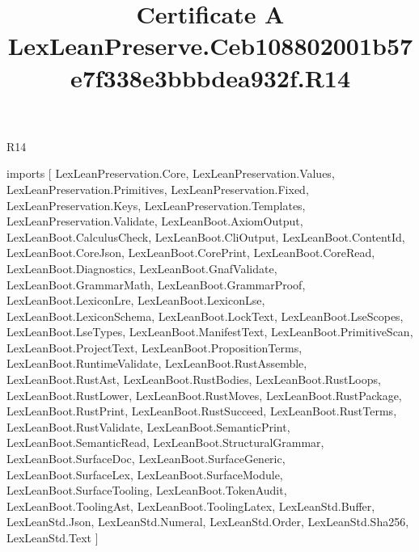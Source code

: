 \begin{lexlean}{R14}
\title{Certificate A LexLeanPreserve.Ceb108802001b57e7f338e3bbbdea932f.R14}
\begin{coremodule}
imports [
  LexLeanPreservation.Core,
  LexLeanPreservation.Values,
  LexLeanPreservation.Primitives,
  LexLeanPreservation.Fixed,
  LexLeanPreservation.Keys,
  LexLeanPreservation.Templates,
  LexLeanPreservation.Validate,
  LexLeanBoot.AxiomOutput,
  LexLeanBoot.CalculusCheck,
  LexLeanBoot.CliOutput,
  LexLeanBoot.ContentId,
  LexLeanBoot.CoreJson,
  LexLeanBoot.CorePrint,
  LexLeanBoot.CoreRead,
  LexLeanBoot.Diagnostics,
  LexLeanBoot.GnafValidate,
  LexLeanBoot.GrammarMath,
  LexLeanBoot.GrammarProof,
  LexLeanBoot.LexiconLre,
  LexLeanBoot.LexiconLse,
  LexLeanBoot.LexiconSchema,
  LexLeanBoot.LockText,
  LexLeanBoot.LseScopes,
  LexLeanBoot.LseTypes,
  LexLeanBoot.ManifestText,
  LexLeanBoot.PrimitiveScan,
  LexLeanBoot.ProjectText,
  LexLeanBoot.PropositionTerms,
  LexLeanBoot.RuntimeValidate,
  LexLeanBoot.RustAssemble,
  LexLeanBoot.RustAst,
  LexLeanBoot.RustBodies,
  LexLeanBoot.RustLoops,
  LexLeanBoot.RustLower,
  LexLeanBoot.RustMoves,
  LexLeanBoot.RustPackage,
  LexLeanBoot.RustPrint,
  LexLeanBoot.RustSucceed,
  LexLeanBoot.RustTerms,
  LexLeanBoot.RustValidate,
  LexLeanBoot.SemanticPrint,
  LexLeanBoot.SemanticRead,
  LexLeanBoot.StructuralGrammar,
  LexLeanBoot.SurfaceDoc,
  LexLeanBoot.SurfaceGeneric,
  LexLeanBoot.SurfaceLex,
  LexLeanBoot.SurfaceModule,
  LexLeanBoot.SurfaceTooling,
  LexLeanBoot.TokenAudit,
  LexLeanBoot.ToolingAst,
  LexLeanBoot.ToolingLatex,
  LexLeanStd.Buffer,
  LexLeanStd.Json,
  LexLeanStd.Numeral,
  LexLeanStd.Order,
  LexLeanStd.Sha256,
  LexLeanStd.Text
]


\end{coremodule}
\end{lexlean}
